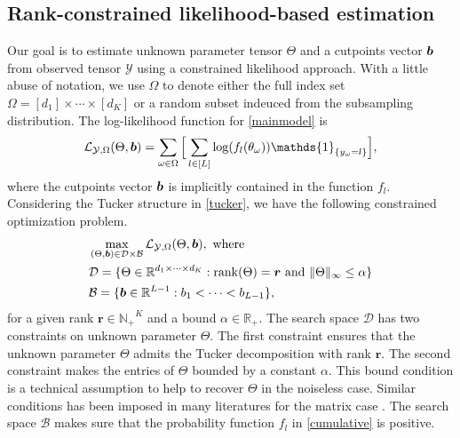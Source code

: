 \documentclass{article}
\theoremstyle{plain}
\theoremstyle{definition}
\begin{document}
\subsection{Rank-constrained likelihood-based estimation}
Our goal is to estimate unknown parameter tensor $\Theta$ and a cutpoints vector $\bm{b}$ from observed tensor $\mathcal{Y}$ using a constrained likelihood approach. With a little abuse of notation, we use $\Omega$ to denote either the full index set $\Omega = [d_1]\times\cdots\times[d_K]$ or a random subset indeuced from the subsampling distribution. The log-likelihood function for \eqref{mainmodel} is
\begin{equation}
    \label{likelihood}
    \begin{aligned}
    \mathcal{L}_{\mathcal{Y},\Omega}(\Theta,\mb) = \sum_{\omega\in\Omega}\Big[\sum_{l\in[L]}\log(f_l(\theta_\omega))\mathds{1}_{\{y_\omega = l\}}\Big],
    \end{aligned}
\end{equation}
where the cutpoints vector $\bm{b}$ is implicitly contained in the function $f_l$.
Considering the Tucker structure in \eqref{tucker}, we have the following constrained optimization problem.
\begin{equation}
    \label{eq:optimization}
    \begin{aligned}
        &\max_{(\Theta, \bm{b})\in \mathcal{D}\times\mathcal{B}}\mathcal{L}_{\mathcal{Y},\Omega}(\Theta,\bm{b}),\text{ where }\\
        &\mathcal{D} = \{\Theta\in \mathbb{R}^{d_1\times\cdots\times d_K}: \operatorname*{rank}(\Theta) = \bm{r} \text{ and } \lVert\Theta\rVert_\infty\leq \alpha \}\\
        &\mathcal{B} = \{\bm{b}\in\mathbb{R}^{L-1}:  b_1<\cdots < b_{L-1}\},
    \end{aligned}
\end{equation}
for a given rank $\bm r\in \mathbb{N_+}^K$ and a bound $\alpha \in \mathbb{R}_+$. The search space $\mathcal{D}$ has two constraints on unknown parameter $\Theta$. The first constraint ensures that the unknown parameter $\Theta$ admits the Tucker decomposition with rank $\bm r$. The second constraint makes the entries of $\Theta$ bounded by a constant $\alpha$. This bound condition is a technical assumption to help to recover $\Theta$ in the noiseless case. Similar conditions has been imposed in many literatures for the matrix case \citep{Davenport20121BitMC,Bhaskar20151bitMC,Cai2013AMC,Bhaskar2016ProbabilisticLM}.
The search space $\mathcal{B}$ makes sure that the probability function $f_l$ in \eqref{cumulative} is positive.
\end{document}
